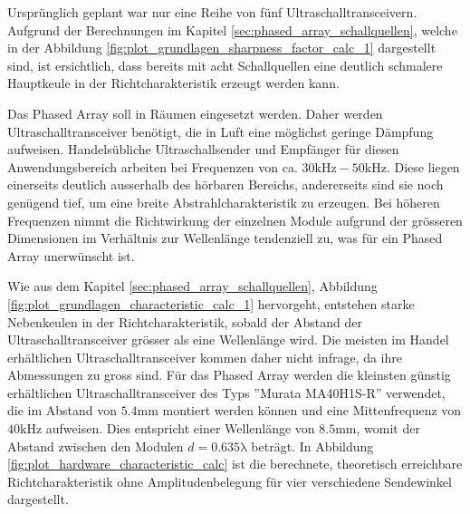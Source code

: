 Ursprünglich geplant war nur eine Reihe von fünf Ultraschalltransceivern. Aufgrund der Berechnungen im Kapitel \ref{sec:phased_array_schallquellen}, welche in der Abbildung \ref{fig:plot_grundlagen_sharpness_factor_calc_1} dargestellt sind, ist ersichtlich, dass bereits mit acht Schallquellen eine deutlich schmalere Hauptkeule in der Richtcharakteristik erzeugt werden kann.

Das Phased Array soll in Räumen eingesetzt werden. Daher werden Ultraschalltransceiver benötigt, die in Luft eine möglichst geringe Dämpfung aufweisen. Handelsübliche Ultraschallsender und Empfänger für diesen Anwendungsbereich arbeiten bei Frequenzen von ca. $30 \mathrm{kHz} - 50 \mathrm{kHz}$. Diese liegen einerseits deutlich ausserhalb des hörbaren Bereichs, andererseits sind sie noch genügend tief, um eine breite Abstrahlcharakteristik zu erzeugen. Bei höheren Frequenzen nimmt die Richtwirkung der einzelnen Module aufgrund der grösseren Dimensionen im Verhältnis zur Wellenlänge tendenziell zu, was für ein Phased Array unerwünscht ist.

Wie aus dem Kapitel \ref{sec:phased_array_schallquellen}, Abbildung \ref{fig:plot_grundlagen_characteristic_calc_1} hervorgeht, entstehen starke Nebenkeulen in der Richtcharakteristik, sobald der Abstand der Ultraschalltransceiver grösser als eine Wellenlänge wird. Die meisten im Handel erhältlichen Ultraschalltransceiver kommen daher nicht infrage, da ihre Abmessungen zu gross sind. Für das Phased Array werden die kleinsten günstig erhältlichen Ultraschalltransceiver des Typs ''Murata MA40H1S-R'' verwendet, die im Abstand von $5.4 \mathrm{mm}$ montiert werden können und eine Mittenfrequenz von $40 \mathrm{kHz}$ aufweisen. Dies entspricht einer Wellenlänge von $8.5 \mathrm{mm}$, womit der Abstand zwischen den Modulen $d = 0.635 \mathrm{\lambda}$ beträgt. In Abbildung \ref{fig:plot_hardware_characteristic_calc} ist die berechnete, theoretisch erreichbare Richtcharakteristik ohne Amplitudenbelegung für vier verschiedene Sendewinkel dargestellt.

